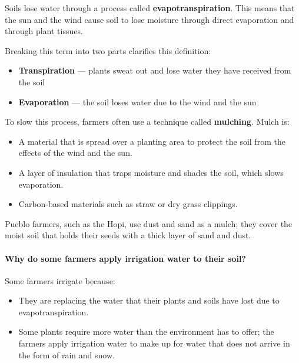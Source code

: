 \documentclass[12pt,]{article}
\providecommand{\tightlist}{%
  \setlength{\itemsep}{0pt}\setlength{\parskip}{0pt}}
\let\oldparagraph\paragraph
\renewcommand{\paragraph}[1]{\oldparagraph{#1}\mbox{}}
\begin{document}
Soils lose water through a process called \textbf{evapotranspiration}. This means that the sun and the wind cause soil to lose moisture through direct evaporation and through plant tissues.

Breaking this term into two parts clarifies this definition:

\begin{itemize}
\tightlist
\item
  \textbf{Transpiration} --- plants sweat out and lose water they have received from the soil
\item
  \textbf{Evaporation} --- the soil loses water due to the wind and the sun
\end{itemize}

To slow this process, farmers often use a technique called \textbf{mulching}. Mulch is:

\begin{itemize}
\tightlist
\item
  A material that is spread over a planting area to protect the soil from the effects of the wind and the sun.
\item
  A layer of insulation that traps moisture and shades the soil, which slows evaporation.
\item
  Carbon-based materials such as straw or dry grass clippings.
\end{itemize}

Pueblo farmers, such as the Hopi, use dust and sand as a mulch; they cover the moist soil that holds their seeds with a thick layer of sand and dust.

\hypertarget{why-do-some-farmers-apply-irrigation-water-to-their-soil}{%
\paragraph{Why do some farmers apply irrigation water to their soil?}\label{why-do-some-farmers-apply-irrigation-water-to-their-soil}}

Some farmers irrigate because:

\begin{itemize}
\tightlist
\item
  They are replacing the water that their plants and soils have lost due to evapotranspiration.
\item
  Some plants require more water than the environment has to offer; the farmers apply irrigation water to make up for water that does not arrive in the form of rain and snow.
\end{itemize}
\end{document}

